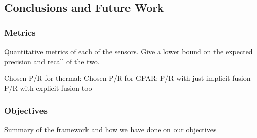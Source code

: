 \subsection{Conclusions and Future Work}

    \subsubsection{Metrics}
    
        Quantitative metrics of each of the sensors. Give a lower bound on the expected precision and recall of the two.
        
        Chosen P/R for thermal:
        Chosen P/R for GPAR:
        P/R with just implicit fusion
        P/R with explicit fusion too
    
    \subsubsection{Objectives}
    
        Summary of the framework and how we have done on our objectives
        
    